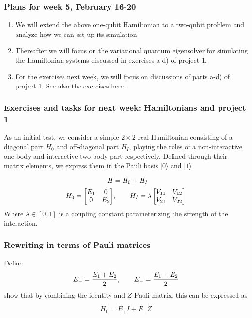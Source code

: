 \documentclass{beamer}
\begin{document}
\begin{frame}
\frametitle{Plans for week 5, February 16-20}

\begin{enumerate}
\item We will extend the above one-qubit Hamiltonian to a two-qubit problem and analyze how we can set up its simulation

\item Thereafter we will focus on the variational quantum eigensolver for simulating the Hamiltonian systems discussed in exercises a-d) of project 1.

\item For the exercises next week, we will focus on discussions of parts a-d) of project 1. See also the exercises here.
\end{enumerate}

\noindent
\end{frame}

\begin{frame}
\frametitle{Exercises and tasks for next week: Hamiltonians and project 1}

As an initial test, we consider a simple $2\times 2$ real
Hamiltonian consisting of a diagonal part $H_0$ and off-diagonal part
$H_I$, playing the roles of a non-interactive one-body and interactive
two-body part respectively. Defined through their matrix elements, we
express them in the Pauli basis $\vert 0\rangle$ and $\vert 1 \rangle$

\begin{align*}
    \begin{split} 
        H &= H_0 + H_I \\
        H_0 = \begin{bmatrix}
            E_1 & 0 \\
            0 & E_2
        \end{bmatrix}&, \hspace{20px}
        H_I = \lambda \begin{bmatrix}
            V_{11} & V_{12} \\
            V_{21} & V_{22}
        \end{bmatrix}
    \end{split}
\end{align*}
Where $\lambda \in [0,1]$ is a coupling constant parameterizing the strength of the interaction.
\end{frame}

\begin{frame}
\frametitle{Rewriting in terms of Pauli matrices}

Define
\[
    E_+ = \frac{E_1 + E_2}{2},\hspace{20px} E_- = \frac{E_1 - E_2}{2}
\]
show  that by combining the identity and $Z$ Pauli matrix, this can be expressed as

\[
    H_0 = E_+ I + E_- Z
\]
\end{frame}
\end{document}
